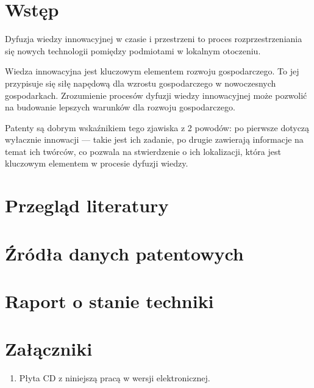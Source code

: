 \documentclass[12pt, withmarginpar]{mwbk}
\begin{document}


\tableofcontents

\chapter*{Wstęp}

Dyfuzja wiedzy innowacyjnej w czasie i przestrzeni to proces
rozprzestrzeniania się nowych technologii pomiędzy podmiotami
w lokalnym otoczeniu.

Wiedza innowacyjna jest kluczowym elementem rozwoju gospodarczego.
To jej przypisuje się siłę napędową dla wzrostu gospodarczego
w nowoczesnych gospodarkach. Zrozumienie procesów dyfuzji 
wiedzy innowacyjnej może pozwolić na budowanie lepszych 
warunków dla rozwoju gospodarczego.

Patenty są dobrym wskaźnikiem tego zjawiska z 2 powodów:
po pierwsze dotyczą wyłacznie innowacji --- takie jest ich zadanie,
po drugie zawierają informacje na temat ich twórców, co pozwala
na stwierdzenie o ich lokalizacji, która jest kluczowym elementem
w procesie dyfuzji wiedzy.


\chapter{Przegląd literatury}\label{ch:intro}



\chapter{Źródła danych patentowych}\label{ch:data}







\chapter{Raport o stanie techniki}\label{ch:data}







\listoffigures

\listoftables

\chapter*{Załączniki}
\begin{enumerate}
\item Płyta CD z niniejszą pracą w wersji elektronicznej.
\end{enumerate}
\end{document}
